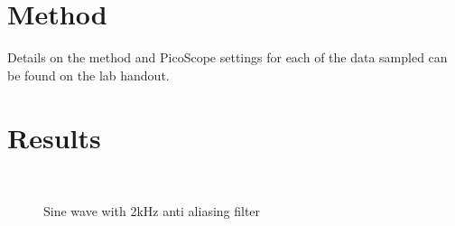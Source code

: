 \documentclass[12pt]{article}
\begin{document}
\section{Method}
Details on the method and PicoScope settings for each of the data sampled can be found on the lab handout.

\section{Results}

\begin{figure}[H]
    \\
    \vspace{-14pt}
    \caption{Sine wave with 2kHz anti aliasing filter}
    \label{fig:sine_1khz_filtered}
\end{figure}
\end{document}
